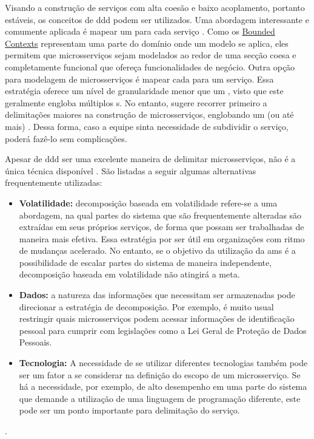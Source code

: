 Visando a construção de serviços com alta coesão e baixo acoplamento, portanto estáveis, os conceitos de \acrshort{ddd} podem ser utilizados. Uma abordagem interessante e comumente aplicada é mapear um  para cada serviço \cite{buildingMicroservices}. Como os \hyperref[section:bounded_context]{Bounded Contexts} representam uma parte do domínio onde um modelo se aplica, eles permitem que microsserviços sejam modelados ao redor de uma secção coesa e completamente funcional que ofereça funcionalidades de negócio. Outra opção para modelagem de microsserviços é mapear cada  para um serviço. Essa estratégia oferece um nível de granularidade menor que um , visto que este geralmente engloba múltiplos s. No entanto,  sugere recorrer primeiro a delimitações maiores na construção de microsserviços, englobando um (ou até mais) . Dessa forma, caso a equipe sinta necessidade de subdividir o serviço, poderá fazê-lo sem complicações.

Apesar de \acrfull{ddd} ser uma excelente maneira de delimitar microsserviços, não é a única técnica disponível \cite{buildingMicroservices}. São listadas a seguir algumas alternativas frequentemente utilizadas:
\begin{itemize}
    \item \textbf{Volatilidade:} decomposição baseada em volatilidade refere-se a uma abordagem, na qual partes do sistema que são frequentemente alteradas são extraídas em seus próprios serviços, de forma que possam ser trabalhadas de maneira mais efetiva. Essa estratégia por ser útil em organizações com ritmo de mudanças acelerado. No entanto, se o objetivo da utilização da \acrshort{ams} é a possibilidade de escalar partes do sistema de maneira independente, decomposição baseada em volatilidade não atingirá a meta.
    \item \textbf{Dados:} a natureza das informações que necessitam ser armazenadas pode direcionar a estratégia de decomposição. Por exemplo, é muito usual restringir quais microsserviços podem acessar informações de identificação pessoal para cumprir com legislações como a Lei Geral de Proteção de Dados Pessoais.
    \item \textbf{Tecnologia:} A necessidade de se utilizar diferentes tecnologias também pode ser um fator a se considerar na definição do escopo de um microsserviço. Se há a necessidade, por exemplo, de alto desempenho em uma parte do sistema que demande a utilização de uma linguagem de programação diferente, este pode ser um ponto importante para delimitação do serviço.
\end{itemize}
\cite{buildingMicroservices}.

